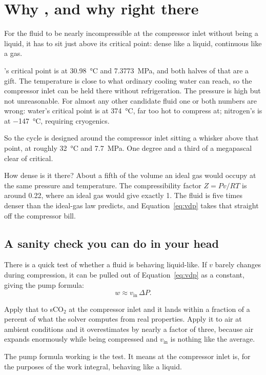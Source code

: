 \documentclass[11pt,a4paper]{report}
\begin{document}
\section{Why , and why right there}

For the fluid to be nearly incompressible at the compressor inlet without
being a liquid, it has to sit just above its critical point: dense like a
liquid, continuous like a gas.

's critical point is at \SI{30.98}{\celsius} and
\SI{7.3773}{\mega\pascal}, and both halves of that are a gift. The
temperature is close to what ordinary cooling water can reach, so the
compressor inlet can be held there without refrigeration. The pressure is
high but not unreasonable. For almost any other candidate fluid one or both
numbers are wrong: water's critical point is at \SI{374}{\celsius}, far too
hot to compress at; nitrogen's is at \SI{-147}{\celsius}, requiring
cryogenics.

So the cycle is designed around the compressor inlet sitting a whisker above
that point, at roughly \SI{32}{\celsius} and \SI{7.7}{\mega\pascal}. One
degree and a third of a megapascal clear of critical.

How dense is it there? About a fifth of the volume an ideal gas would occupy
at the same pressure and temperature. The compressibility factor $Z = Pv/RT$
is around \num{0.22}, where an ideal gas would give exactly \num{1}. The
fluid is five times denser than the ideal-gas law predicts, and
Equation~\eqref{eq:vdp} takes that straight off the compressor bill.

\subsection{A sanity check you can do in your head}

There is a quick test of whether a fluid is behaving liquid-like. If $v$
barely changes during compression, it can be pulled out of
Equation~\eqref{eq:vdp} as a constant, giving the pump formula:
\[
  w \approx v_{\text{in}}\, \Delta P.
\]

Apply that to sCO$_2$ at the compressor inlet and it lands within a fraction
of a percent of what the solver computes from real properties. Apply it to
air at ambient conditions and it overestimates by nearly a factor of three,
because air expands enormously while being compressed and $v_{\text{in}}$ is
nothing like the average.

The pump formula working is the test. It means  at the compressor
inlet is, for the purposes of the work integral, behaving like a liquid.
\end{document}
